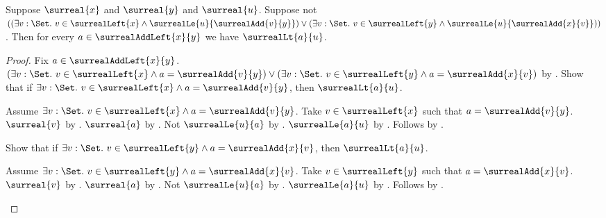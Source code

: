 \begin{lemma}\label{surreal_add_left_below_without_interpolant}
    Suppose $\surreal{x}$ and $\surreal{y}$ and $\surreal{u}$.
    Suppose not $((\exists v:\Set.\ v\in\surrealLeft{x}\land
            \surrealLe{u}{\surrealAdd{v}{y}})
        \lor(\exists v:\Set.\ v\in\surrealLeft{y}\land
            \surrealLe{u}{\surrealAdd{x}{v}}))$.
    Then for every $a\in\surrealAddLeft{x}{y}$ we have
        $\surrealLt{a}{u}$.
\end{lemma}
\begin{proof}
    Fix $a\in\surrealAddLeft{x}{y}$.
    $(\exists v:\Set.\ v\in\surrealLeft{x}\land
            a=\surrealAdd{v}{y})
        \lor
        (\exists v:\Set.\ v\in\surrealLeft{y}\land
            a=\surrealAdd{x}{v})$
        by .
    Show that if $\exists v:\Set.\ v\in\surrealLeft{x}\land
            a=\surrealAdd{v}{y}$, then $\surrealLt{a}{u}$.
    \begin{subproof}
        Assume $\exists v:\Set.\ v\in\surrealLeft{x}\land
            a=\surrealAdd{v}{y}$.
        Take $v\in\surrealLeft{x}$ such that
            $a=\surrealAdd{v}{y}$.
        $\surreal{v}$ by .
        $\surreal{a}$ by .
        Not $\surrealLe{u}{a}$ by \auto.
        $\surrealLe{a}{u}$
            by .
        Follows by .
    \end{subproof}
    Show that if $\exists v:\Set.\ v\in\surrealLeft{y}\land
            a=\surrealAdd{x}{v}$, then $\surrealLt{a}{u}$.
    \begin{subproof}
        Assume $\exists v:\Set.\ v\in\surrealLeft{y}\land
            a=\surrealAdd{x}{v}$.
        Take $v\in\surrealLeft{y}$ such that
            $a=\surrealAdd{x}{v}$.
        $\surreal{v}$ by .
        $\surreal{a}$ by .
        Not $\surrealLe{u}{a}$ by \auto.
        $\surrealLe{a}{u}$
            by .
        Follows by .
    \end{subproof}
\end{proof}


